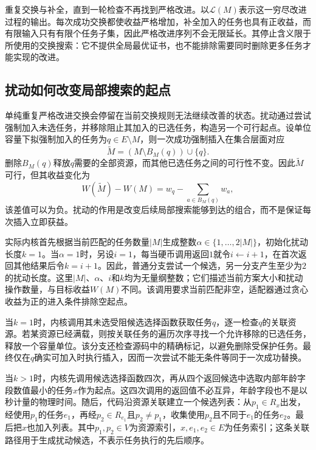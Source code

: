 重复交换与补全，直到一轮检查不再找到严格改进。以$\mathcal{L}(M)$表示这一穷尽改进过程的输出。每次成功交换都使收益严格增加，补全加入的任务也具有正收益，而有限输入只有有限个任务子集，因此严格改进序列不会无限延长。其停止含义限于所使用的交换搜索：它不提供全局最优证书，也不能排除需要同时删除更多任务才能实现的改进。

\subsection{扰动如何改变局部搜索的起点}

单纯重复严格改进交换会停留在当前交换规则无法继续改善的状态。扰动通过尝试强制加入未选任务，并移除阻止其加入的已选任务，构造另一个可行起点。设单位容量下拟强制加入的任务为$q\in E\setminus M$，则一次成功强制插入在集合层面对应
\begin{equation}
 \widetilde M=(M\setminus B_M(q))\cup\{q\}.
 \label{s0303:forced_insert}
\end{equation}
删除$B_M(q)$释放$q$需要的全部资源，而其他已选任务之间的可行性不变。因此$\widetilde M$可行，但其收益变化为
\begin{equation}
 W(\widetilde M)-W(M)
 =w_q-\sum_{a\in B_M(q)}w_a,
 \label{s0303:perturb_gain}
\end{equation}
该差值可以为负。扰动的作用是改变后续局部搜索能够到达的组合，而不是保证每次插入立即获益。

实际内核首先根据当前匹配的任务数量$|M|$生成整数$\alpha\in\{1,\ldots,2|M|\}$，初始化扰动长度$k=1$。当$\alpha=1$时，另设$i=1$，每当硬币调用返回$1$就令$i\leftarrow i+1$，在首次返回其他结果后令$k=i+1$。因此，普通分支尝试一个候选，另一分支产生至少为$2$的扰动长度。这里$|M|$、$\alpha$、$i$和$k$均为无量纲整数；它们描述当前方案大小和扰动操作数量，与目标收益$W(M)$不同。该调用要求当前匹配非空，适配器通过贪心收益为正的进入条件排除空起点。

当$k=1$时，内核调用其未选受阻候选选择函数获取任务$q$，逐一检查$q$的关联资源。若某资源已经满载，则按关联任务的遍历次序寻找一个允许移除的已选任务，释放一个容量单位。该分支还检查源码中的精确标记，以避免删除受保护任务。最终仅在$q$确实可加入时执行插入，因而一次尝试不能无条件等同于一次成功替换。

当$k>1$时，内核先调用候选选择函数四次，再从四个返回候选中选取内部年龄字段数值最小的任务$x$作为起点。这四次调用的返回值不必互异，年龄字段也不是以秒计量的物理时间。随后，代码沿资源关联建立一个候选列表：从$p_1\in R_x$出发，经使用$p_1$的任务$e_1$，再经$p_2\in R_{e_1}$且$p_2\ne p_1$，收集使用$p_2$且不同于$e_1$的任务$e_2$。最后把$x$也加入列表。其中$p_1,p_2\in V$为资源索引，$x,e_1,e_2\in E$为任务索引；这条关联路径用于生成扰动候选，不表示任务执行的先后顺序。

